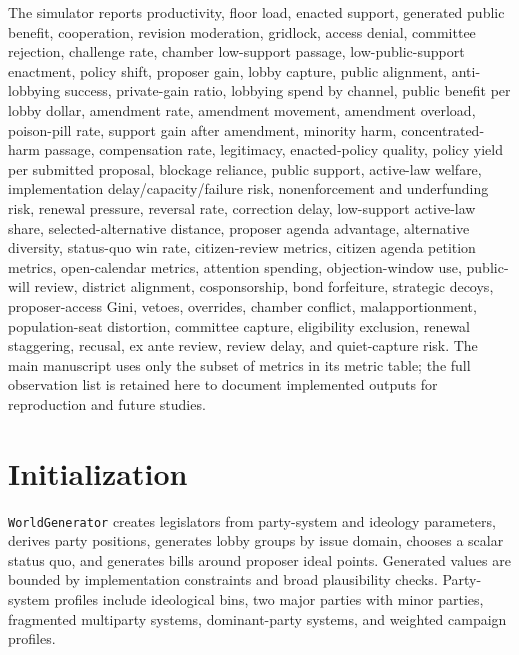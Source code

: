 \documentclass[manuscript]{acmart}
\begin{document}
The simulator reports productivity, floor load, enacted support, generated public benefit, cooperation, revision moderation, gridlock, access denial, committee rejection, challenge rate, chamber low-support passage, low-public-support enactment, policy shift, proposer gain, lobby capture, public alignment, anti-lobbying success, private-gain ratio, lobbying spend by channel, public benefit per lobby dollar, amendment rate, amendment movement, amendment overload, poison-pill rate, support gain after amendment, minority harm, concentrated-harm passage, compensation rate, legitimacy, enacted-policy quality, policy yield per submitted proposal, blockage reliance, public support, active-law welfare, implementation delay/capacity/failure risk, nonenforcement and underfunding risk, renewal pressure, reversal rate, correction delay, low-support active-law share, selected-alternative distance, proposer agenda advantage, alternative diversity, status-quo win rate, citizen-review metrics, citizen agenda petition metrics, open-calendar metrics, attention spending, objection-window use, public-will review, district alignment, cosponsorship, bond forfeiture, strategic decoys, proposer-access Gini, vetoes, overrides, chamber conflict, malapportionment, population-seat distortion, committee capture, eligibility exclusion, renewal staggering, recusal, ex ante review, review delay, and quiet-capture risk.
The main manuscript uses only the subset of metrics in its metric table; the full observation list is retained here to document implemented outputs for reproduction and future studies.

\section{Initialization}
\label{sec:appendix-initialization}

\texttt{WorldGenerator} creates legislators from party-system and ideology parameters, derives party positions, generates lobby groups by issue domain, chooses a scalar status quo, and generates bills around proposer ideal points. Generated values are bounded by implementation constraints and broad plausibility checks. Party-system profiles include ideological bins, two major parties with minor parties, fragmented multiparty systems, dominant-party systems, and weighted campaign profiles.
\end{document}
